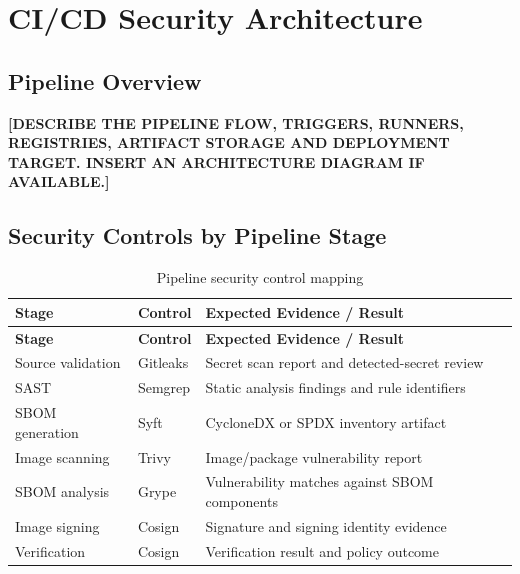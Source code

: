 \documentclass[11pt,a4paper]{report}
\newcommand{\placeholder}[1]{\textbf{[#1]}}
\begin{document}
\chapter{CI/CD Security Architecture}

\section{Pipeline Overview}
\placeholder{DESCRIBE THE PIPELINE FLOW, TRIGGERS, RUNNERS, REGISTRIES,
ARTIFACT STORAGE AND DEPLOYMENT TARGET. INSERT AN ARCHITECTURE DIAGRAM
IF AVAILABLE.}


\section{Security Controls by Pipeline Stage}
\begin{longtable}{@{}p{29mm}p{37mm}p{79mm}@{}}
    \caption{Pipeline security control mapping}\\
    \toprule
    \textbf{Stage} & \textbf{Control} & \textbf{Expected Evidence / Result} \\
    \midrule
    \endfirsthead
    \toprule
    \textbf{Stage} & \textbf{Control} & \textbf{Expected Evidence / Result} \\
    \midrule
    \endhead
    Source validation & Gitleaks & Secret scan report and detected-secret review \\
    SAST & Semgrep & Static analysis findings and rule identifiers \\
    SBOM generation & Syft & CycloneDX or SPDX inventory artifact \\
    Image scanning & Trivy & Image/package vulnerability report \\
    SBOM analysis & Grype & Vulnerability matches against SBOM components \\
    Image signing & Cosign & Signature and signing identity evidence \\
    Verification & Cosign & Verification result and policy outcome \\
    \bottomrule
\end{longtable}
\end{document}

